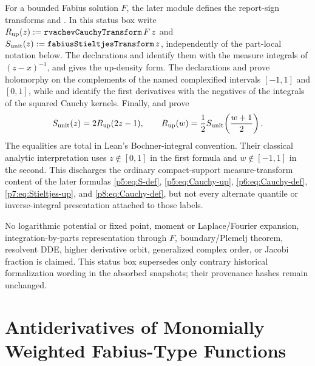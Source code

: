 \documentclass[11pt,oneside]{article}
\newcommand{\integrationreportreset}{%
  \clearpage
  \setcounter{section}{0}%
  \renewcommand{\thesection}{\arabic{section}}}
\theoremstyle{definition}
\theoremstyle{remark}
\newcommand{\1}{\mathbf 1}
\begin{document}
\begin{statusbox}
For a bounded Fabius solution \(F\), the later module
 defines the report-sign transforms
 and
.  In this status box write
\(R_{\rm up}(z):=\mathtt{rvachevCauchyTransform}\,F\,z\) and
\(S_{\rm unit}(z):=\mathtt{fabiusStieltjesTransform}\,z\), independently of the
part-local notation below.  The declarations
 and
 identify them with the measure integrals of
\((z-x)^{-1}\), and
 gives the up-density form.
The declarations  and
 prove holomorphy on the complements of
the named complexified intervals \([-1,1]\) and \([0,1]\), while
 and
 identify the first derivatives with
the negatives of the integrals of the squared Cauchy kernels.  Finally,
 and
 prove
\[
 S_{\rm unit}(z)=2R_{\rm up}(2z-1),\qquad
 R_{\rm up}(w)=\frac12S_{\rm unit}\!\left(\frac{w+1}{2}\right).
\]
The equalities are total in Lean's Bochner-integral convention.  Their classical analytic
interpretation uses \(z\notin[0,1]\) in the first formula and
\(w\notin[-1,1]\) in the second.
This discharges the ordinary compact-support measure-transform content of the later
formulas \eqref{p5:eq:S-def}, \eqref{p5:eq:Cauchy-up},
\eqref{p6:eq:Cauchy-def}, \eqref{p7:eq:Stieltjes-up},
and \eqref{p8:eq:Cauchy-def}, but not every alternate
quantile or inverse-integral presentation attached to those labels.

No logarithmic potential or fixed point, moment or Laplace/Fourier expansion,
integration-by-parts representation through \(F\), boundary/Plemelj theorem, resolvent
DDE, higher derivative orbit, generalized complex order, or Jacobi fraction is claimed.
This status box supersedes only contrary historical formalization wording in the absorbed
snapshots; their provenance hashes remain unchanged.
\end{statusbox}
\clearpage
\integrationreportreset
\part{Antiderivatives of Monomially Weighted Fabius-Type Functions}
\end{document}
